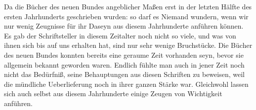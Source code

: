 Da die Bücher des neuen Bundes angeblicher Maßen erst in der letzten Hälfte des ersten Jahrhunderts geschrieben wurden: so darf es Niemand wundern, wenn wir nur wenig Zeugnisse für ihr Daseyn aus diesem Jahrhunderte anführen können. Es gab der Schriftsteller in diesem Zeitalter noch nicht so viele, und was von ihnen sich bis auf uns erhalten hat, sind nur sehr wenige Bruchstücke. Die Bücher des neuen Bundes konnten bereits eine geraume Zeit vorhanden seyn, bevor sie allgemein bekannt geworden waren. Endlich fühlte man auch in jener Zeit noch nicht das Bedürfniß, seine Behauptungen aus diesen Schriften zu beweisen, weil die mündliche Ueberlieferung noch in ihrer ganzen Stärke war. Gleichwohl lassen sich auch selbst aus diesem Jahrhunderte einige Zeugen von Wichtigkeit anführen.
